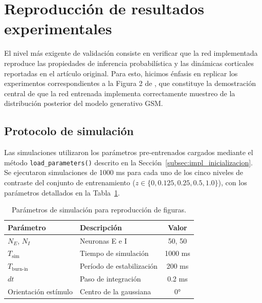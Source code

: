 

\section{Reproducción de resultados experimentales}
\label{sec:res_figures}

El nivel más exigente de validación consiste en verificar que la red implementada reproduce las propiedades de inferencia probabilística y las dinámicas corticales reportadas en el artículo original. Para esto, hicimos énfasis en replicar los experimentos correspondientes a la Figura 2 de \citet{echeveste2020cortical}, que constituye la demostración central de que la red entrenada implementa correctamente muestreo de la distribución posterior del modelo generativo \acrshort{GSM}.

\subsection{Protocolo de simulación}
\label{subsec:res_protocol}

Las simulaciones utilizaron los parámetros pre-entrenados cargados mediante el método \texttt{load\_parameters()} descrito en la Sección~\ref{subsec:impl_inicializacion}. Se ejecutaron simulaciones de 1000 ms para cada uno de los cinco niveles de contraste del conjunto de entrenamiento ($z \in \{0, 0.125, 0.25, 0.5, 1.0\}$), con los parámetros detallados en la Tabla~\ref{tab:simulation_params}.

\begin{table}[H]
\centering
\caption{Parámetros de simulación para reproducción de figuras.}
\label{tab:simulation_params}
\begin{tabular}{llc}
\toprule
\textbf{Parámetro} & \textbf{Descripción} & \textbf{Valor} \\
\midrule
$N_E$, $N_I$ & Neuronas E e I & 50, 50 \\
$T_{\text{sim}}$ & Tiempo de simulación & 1000 ms \\
$T_{\text{burn-in}}$ & Período de estabilización & 200 ms \\
$dt$ & Paso de integración & 0.2 ms \\
Orientación estímulo & Centro de la gaussiana & $0°$ \\
\bottomrule
\end{tabular}
\end{table}

